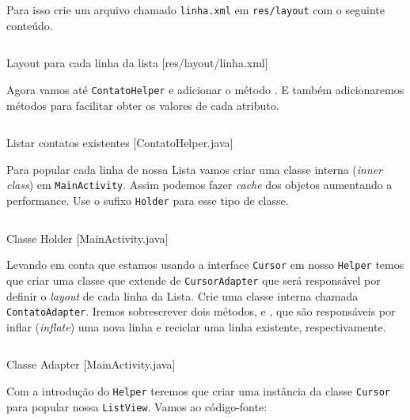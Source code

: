 Para isso crie um arquivo chamado \texttt{linha.xml} em \texttt{res/layout} com o seguinte conteúdo.

\begin{listing}[H]
  \inputminted[linenos=true,frame=bottomline,tabsize=3]{ xml }{ source/linha-1.xml }
  \caption{Layout para cada linha da lista [res/layout/linha.xml]}
\end{listing}

Agora vamos até \texttt{ContatoHelper} e adicionar o método . E também adicionaremos
métodos para facilitar obter os valores de cada atributo.

\begin{listing}[H]
  \inputminted[linenos=true,frame=bottomline,tabsize=3]{ java }{ source/ContatoHelper-3.java }
  \caption{Listar contatos existentes [ContatoHelper.java]}
\end{listing}

Para popular cada linha de nossa Lista vamos criar uma classe interna (\textit{inner class}) em
\texttt{MainActivity}. Assim podemos fazer \textit{cache} dos objetos aumentando a performance.
Use o sufixo \texttt{Holder} para esse tipo de classe.

\begin{listing}[H]
  \inputminted[linenos=true,frame=bottomline,tabsize=3]{ java }{ source/MainActivity-4.java }
  \caption{Classe Holder [MainActivity.java]}
\end{listing}

Levando em conta que estamos usando a interface \texttt{Cursor} em nosso \texttt{Helper} temos
que criar uma classe que extende de \texttt{CursorAdapter} que será responsável por definir o
\textit{layout} de cada linha da Lista. Crie uma classe interna chamada \texttt{ContatoAdapter}.
Iremos sobrescrever dois métodos,  e , que são responsáveis
por inflar (\textit{inflate}) uma nova linha e reciclar uma linha existente, respectivamente.

\begin{listing}[H]
  \inputminted[linenos=true,frame=bottomline,tabsize=3]{ java }{ source/MainActivity-5.java }
  \caption{Classe Adapter [MainActivity.java]}
\end{listing}

Com a introdução do \texttt{Helper} teremos que criar uma instância da classe \texttt{Cursor}
para popular nossa \texttt{ListView}. Vamos ao código-fonte:

